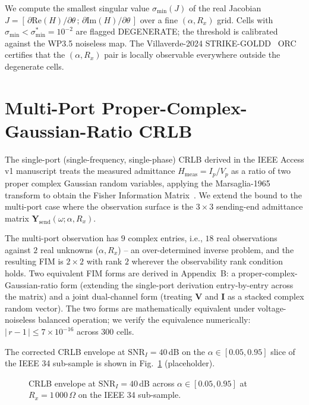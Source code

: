 \documentclass[journal]{IEEEtran}
\newcommand{\headlineCRLBConsist}{$|\,r-1\,| \leq 7\!\times\!10^{-16}$ across 300 cells}
\begin{document}
We compute the smallest singular value $\sigma_\mathrm{min}(J)$
of the real Jacobian $J = [\,\partial \mathrm{Re}(H)/\partial\theta\,;\,
\partial \mathrm{Im}(H)/\partial\theta\,]$ over a fine
$(\alpha, R_x)$ grid.  Cells with $\sigma_\mathrm{min} <
\sigma_\mathrm{min}^* = 10^{-2}$ are flagged DEGENERATE; the
threshold is calibrated against the WP3.5 noiseless map.  The
Villaverde-2024 STRIKE-GOLDD~\cite{Villaverde2024STRIKEGOLDD}
ORC certifies that the $(\alpha, R_x)$ pair is locally
observable everywhere outside the degenerate cells.

\section{Multi-Port Proper-Complex-Gaussian-Ratio CRLB}\label{sec:crlb}

The single-port (single-frequency, single-phase) CRLB derived in
the IEEE Access v1 manuscript treats the measured admittance
$H_\mathrm{meas} = I_p / V_p$ as a ratio of two proper complex
Gaussian random variables, applying the Marsaglia-1965 transform
to obtain the Fisher Information Matrix~\cite{Marsaglia1965Ratio,
NehoraiHawkes2000}.  We extend the bound to the multi-port case
where the observation surface is the $3 \times 3$ sending-end
admittance matrix $\boldsymbol{Y}_\mathrm{send}(\omega; \alpha, R_x)$.

The multi-port observation has $9$ complex entries, i.e., $18$
real observations against $2$ real unknowns ($\alpha, R_x$) --
an over-determined inverse problem, and the resulting FIM is
$2 \times 2$ with rank $2$ wherever the observability rank
condition holds.  Two equivalent FIM forms are derived in
Appendix~B: a proper-complex-Gaussian-ratio form (extending the
single-port derivation entry-by-entry across the matrix) and a
joint dual-channel form (treating $\boldsymbol{V}$ and
$\boldsymbol{I}$ as a stacked complex random vector).  The two
forms are mathematically equivalent under voltage-noiseless
balanced operation; we verify the equivalence numerically:
\headlineCRLBConsist{}.

The corrected CRLB envelope at $\mathrm{SNR}_I = 40$\,dB on the
$\alpha \in [0.05, 0.95]$ slice of the IEEE 34 sub-sample is
shown in Fig.~\ref{fig:crlb_envelope} (placeholder).

\begin{figure}[t]
\centering
{}
\caption{CRLB envelope at $\mathrm{SNR}_I = 40$\,dB across
         $\alpha \in [0.05, 0.95]$ at $R_x = 1\,000\,\Omega$
         on the IEEE 34 sub-sample.}
\label{fig:crlb_envelope}
\end{figure}
\end{document}

